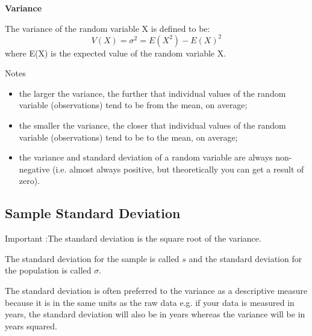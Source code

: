 \documentclass[]{report}
\begin{document}
{
\textbf{Variance}

The variance of the random variable X is defined to be: 
\[ V(X) = \sigma^2 = E(X^2) - E(X)^2 \]
where E(X) is the expected value of the random variable X. 

Notes 

\begin{itemize}
\item the larger the variance, the further that individual values of the random variable (observations) tend to be from the mean, on average; 
\item the smaller the variance, the closer that individual values of the random variable (observations) tend to be to the mean, on average; 
\item the variance and standard deviation of a random variable are always non-negative (i.e. almost always positive, but theoretically you can get a result of zero). 
\end{itemize}









\subsection{Sample Standard Deviation}
Important :The standard deviation  is the square root of the variance.

The standard deviation for the sample is called $s$ and the standard deviation for the population is called $\sigma$.

The standard deviation is often preferred to the variance as a descriptive measure because it is in the same units as the raw data e.g. if your data is measured in years, the standard deviation will also be in years whereas the variance will be in years squared.


}
\end{document}
